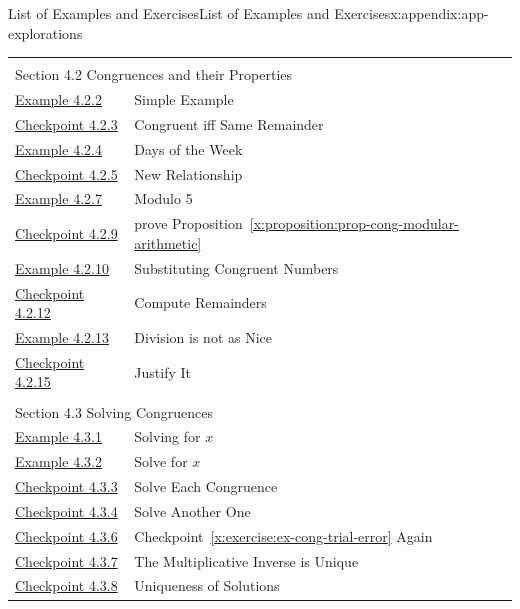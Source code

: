 \documentclass[oneside,10pt,]{book}
\newcommand{\xreffont}{\relax}
\numberwithin{equation}{section}
\begin{document}
\begin{appendixptx}{List of Examples and Exercises}{}{List of Examples and Exercises}{}{}{x:appendix:app-explorations}
\begin{longtable}[l]{ll}
\multicolumn{2}{l}{\null}\\[1.5ex] \multicolumn{2}{l}{\large Section 4.2 Congruences and their Properties}\\[0.5ex]
\hyperref[x:example:eg-cong-example]{Example 4.2.2}& Simple Example\\
\hyperref[x:exercise:ex-cong-remainder]{Checkpoint 4.2.3}& Congruent iff Same Remainder\\
\hyperref[x:example:eg-cong-week]{Example 4.2.4}& Days of the Week\\
\hyperref[x:exercise:eg-cong-week-2]{Checkpoint 4.2.5}& New Relationship\\
\hyperref[x:example:eg-cong-mod5]{Example 4.2.7}& Modulo 5\\
\hyperref[x:exercise:ex-cong-prove-modular-arithmetic]{Checkpoint 4.2.9}& prove Proposition~{\xreffont\ref*{x:proposition:prop-cong-modular-arithmetic}}\\
\hyperref[x:example:eg-cong-modular-arithmetic]{Example 4.2.10}& Substituting Congruent Numbers\\
\hyperref[x:exercise:ex-cong-compute-remainder]{Checkpoint 4.2.12}& Compute Remainders\\
\hyperref[x:example:eg-cong-dividing-doesnt-work]{Example 4.2.13}& Division is not as Nice\\
\hyperref[x:exercise:ex-cong-division-explain]{Checkpoint 4.2.15}& Justify It\\
\multicolumn{2}{l}{\null}\\[1.5ex] \multicolumn{2}{l}{\large Section 4.3 Solving Congruences}\\[0.5ex]
\hyperref[x:example:eg-cong-solve-congruence]{Example 4.3.1}& Solving for \(x\)\\
\hyperref[x:example:eg-cong-solve-congruence-express]{Example 4.3.2}& Solve for \(x\)\\
\hyperref[x:exercise:ex-cong-solve-for-x]{Checkpoint 4.3.3}& Solve Each Congruence\\
\hyperref[x:exercise:ex-cong-trial-error]{Checkpoint 4.3.4}& Solve Another One\\
\hyperref[x:exercise:ex-cong-multiplicative-inverse]{Checkpoint 4.3.6}& Checkpoint~{\xreffont\ref*{x:exercise:ex-cong-trial-error}} Again\\
\hyperref[x:exercise:ex-cong-prove-inverse-unique]{Checkpoint 4.3.7}& The Multiplicative Inverse is Unique\\
\hyperref[x:exercise:ex-cong-rel-prime-unique]{Checkpoint 4.3.8}& Uniqueness of Solutions\\

\end{longtable}
\end{appendixptx}
\end{document}
